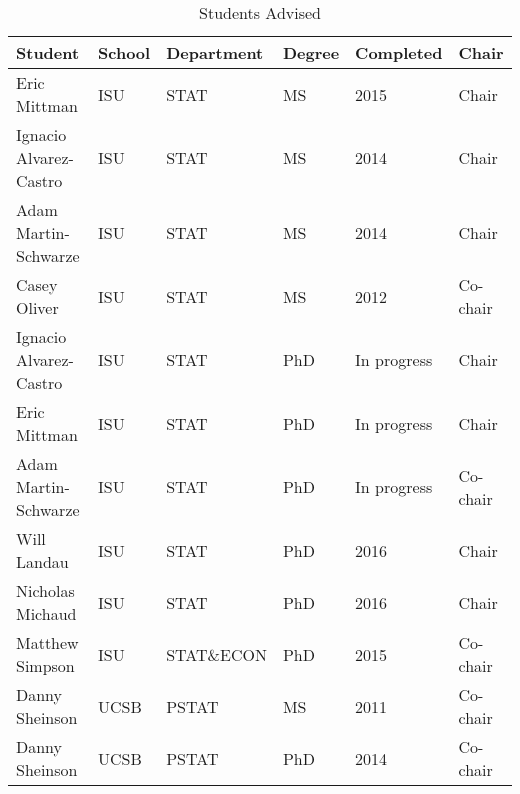 \begin{table}[h]
\centering
\caption{Students Advised} 
\label{tab:advisees}
\begin{tabular}{llllll}
  \hline
Student & School & Department & Degree & Completed & Chair \\ 
  \hline
Eric Mittman & ISU & STAT & MS & 2015 & Chair \\ 
  Ignacio Alvarez-Castro & ISU & STAT & MS & 2014 & Chair \\ 
  Adam Martin-Schwarze & ISU & STAT & MS & 2014 & Chair \\ 
  Casey Oliver & ISU & STAT & MS & 2012 & Co-chair \\ 
  Ignacio Alvarez-Castro & ISU & STAT & PhD & In progress & Chair \\ 
  Eric Mittman & ISU & STAT & PhD & In progress & Chair \\ 
  Adam Martin-Schwarze & ISU & STAT & PhD & In progress & Co-chair \\ 
  Will Landau & ISU & STAT & PhD & 2016 & Chair \\ 
  Nicholas Michaud & ISU & STAT & PhD & 2016 & Chair \\ 
  Matthew Simpson & ISU & STAT\&ECON & PhD & 2015 & Co-chair \\ 
  Danny Sheinson & UCSB & PSTAT & MS & 2011 & Co-chair \\ 
  Danny Sheinson & UCSB & PSTAT & PhD & 2014 & Co-chair \\ 
   \hline
\end{tabular}
\end{table}
